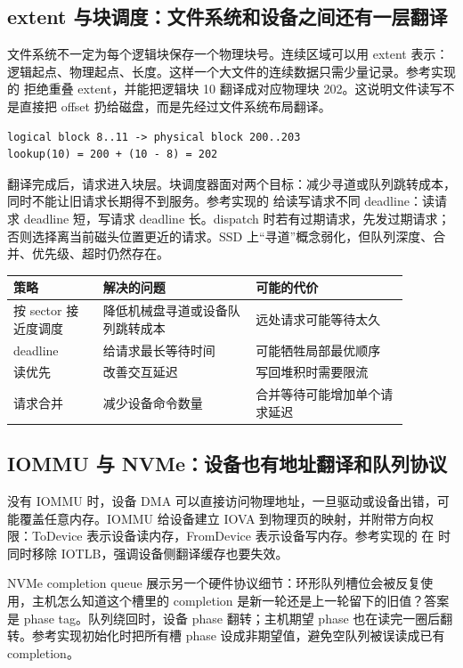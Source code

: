 \subsection{extent 与块调度：文件系统和设备之间还有一层翻译}

文件系统不一定为每个逻辑块保存一个物理块号。连续区域可以用 extent 表示：逻辑起点、物理起点、长度。这样一个大文件的连续数据只需少量记录。参考实现的  拒绝重叠 extent，并能把逻辑块 10 翻译成对应物理块 202。这说明文件读写不是直接把 offset 扔给磁盘，而是先经过文件系统布局翻译。

\begin{lstlisting}
logical block 8..11 -> physical block 200..203
lookup(10) = 200 + (10 - 8) = 202
\end{lstlisting}

翻译完成后，请求进入块层。块调度器面对两个目标：减少寻道或队列跳转成本，同时不能让旧请求长期得不到服务。参考实现的  给读写请求不同 deadline：读请求 deadline 短，写请求 deadline 长。dispatch 时若有过期请求，先发过期请求；否则选择离当前磁头位置更近的请求。SSD 上“寻道”概念弱化，但队列深度、合并、优先级、超时仍然存在。

\begin{longtable}{p{0.2\linewidth}p{0.34\linewidth}p{0.34\linewidth}}
\toprule
策略 & 解决的问题 & 可能的代价 \\
\midrule
按 sector 接近度调度 & 降低机械盘寻道或设备队列跳转成本 & 远处请求可能等待太久 \\
deadline & 给请求最长等待时间 & 可能牺牲局部最优顺序 \\
读优先 & 改善交互延迟 & 写回堆积时需要限流 \\
请求合并 & 减少设备命令数量 & 合并等待可能增加单个请求延迟 \\
\bottomrule
\end{longtable}

\subsection{IOMMU 与 NVMe：设备也有地址翻译和队列协议}

没有 IOMMU 时，设备 DMA 可以直接访问物理地址，一旦驱动或设备出错，可能覆盖任意内存。IOMMU 给设备建立 IOVA 到物理页的映射，并附带方向权限：ToDevice 表示设备读内存，FromDevice 表示设备写内存。参考实现的  在  时同时移除 IOTLB，强调设备侧翻译缓存也要失效。

NVMe completion queue 展示另一个硬件协议细节：环形队列槽位会被反复使用，主机怎么知道这个槽里的 completion 是新一轮还是上一轮留下的旧值？答案是 phase tag。队列绕回时，设备 phase 翻转；主机期望 phase 也在读完一圈后翻转。参考实现初始化时把所有槽 phase 设成非期望值，避免空队列被误读成已有 completion。

